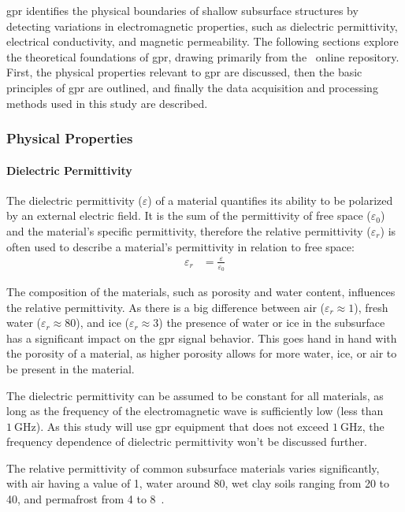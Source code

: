\gls{gpr} identifies the physical boundaries of shallow subsurface structures by detecting variations in electromagnetic properties, such as dielectric permittivity, electrical conductivity, and magnetic permeability. 
The following sections explore the theoretical foundations of \gls{gpr}, drawing primarily from the~\citet{geoscidevelopersGroundPenetratingRadar2017} online repository.
First, the physical properties relevant to \gls{gpr} are discussed, then the basic principles of \gls{gpr} are outlined, and finally the data acquisition and processing methods used in this study are described.    
\subsubsection{Physical Properties}
\paragraph{Dielectric Permittivity} 
The dielectric permittivity (\(\varepsilon\)) of a material quantifies its ability to be polarized by an external electric field. 
It is the sum of the permittivity of free space (\(\varepsilon_0\)) and the material's specific permittivity, 
therefore the relative permittivity (\(\varepsilon_r\)) is often used to describe a material's permittivity in relation to free space:
\begin{align}
    \varepsilon_r &= \frac{\varepsilon}{\varepsilon_0}\label{al:varepsilon}
\end{align}

The composition of the materials, such as porosity and water content, influences the relative permittivity. 
As there is a big difference between air (\(\varepsilon_r \approx 1\)), fresh water (\(\varepsilon_r \approx 80\)), and ice (\(\varepsilon_r \approx 3\)) the presence of water or ice in the subsurface has a significant impact on the \gls{gpr} signal behavior.
This goes hand in hand with the porosity of a material, as higher porosity allows for more water, ice, or air to be present in the material. 

The dielectric permittivity can be assumed to be constant for all materials, as long as the frequency of the electromagnetic wave is sufficiently low (less than \(\SI{1}{\giga\hertz}\)). 
As this study will use \gls{gpr} equipment that does not exceed \(\SI{1}{\giga\hertz}\), the frequency dependence of dielectric permittivity won't be discussed further.

The relative permittivity of common subsurface materials varies significantly, with air having a value of 1, water around 80, wet clay soils ranging from 20 to 40, and permafrost from 4 to 8~\citep{geoscidevelopersGroundPenetratingRadar2017}.

